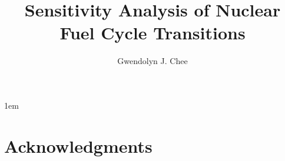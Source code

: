 \documentclass[edeposit,fullpage,11pt]{uiucthesis2009}
\title{Sensitivity Analysis of Nuclear Fuel Cycle Transitions}
\author{Gwendolyn J. Chee}
\begin{document}

%
\maketitle
\justify
\parindent 1em%

\frontmatter
%
\begin{abstract}
    
\end{abstract}

%
\begin{dedication}

\end{dedication}

%
\chapter*{Acknowledgments}
																																			
%
\tableofcontents

%
\listoftables

%
\listoffigures

%

\end{document}
